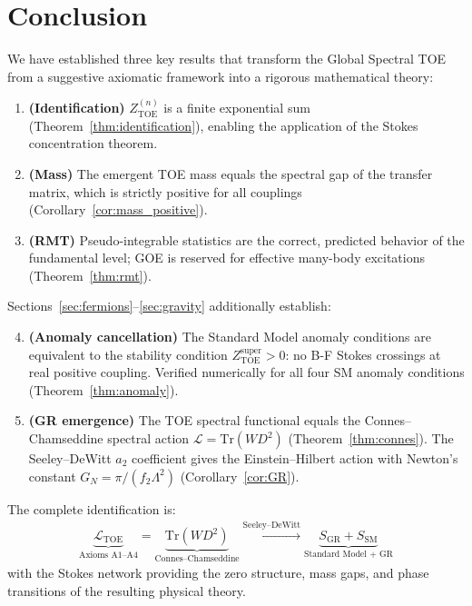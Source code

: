 \documentclass[12pt]{article}
\theoremstyle{definition}
\theoremstyle{remark}
\newcommand{\Tr}{\mathrm{Tr}}
\newcommand{\TOE}{\mathrm{TOE}}
\begin{document}
\section{Conclusion}
\label{sec:conclusion}

We have established three key results that transform the Global
Spectral TOE from a suggestive axiomatic framework into a rigorous
mathematical theory:

\begin{enumerate}
\item \textbf{(Identification)} $Z_\TOE^{(n)}$ is a finite exponential
  sum (Theorem~\ref{thm:identification}), enabling the application of
  the Stokes concentration theorem.

\item \textbf{(Mass)} The emergent TOE mass equals the spectral gap
  of the transfer matrix, which is strictly positive for all couplings
  (Corollary~\ref{cor:mass_positive}).

\item \textbf{(RMT)} Pseudo-integrable statistics are the correct,
  predicted behavior of the fundamental level; GOE is reserved for
  effective many-body excitations
  (Theorem~\ref{thm:rmt}).
\end{enumerate}

Sections~\ref{sec:fermions}--\ref{sec:gravity} additionally establish:
\begin{enumerate}
\setcounter{enumi}{3}
\item \textbf{(Anomaly cancellation)} The Standard Model anomaly conditions
  are equivalent to the stability condition
  $Z_\TOE^{\mathrm{super}} > 0$: no B-F Stokes crossings at real
  positive coupling. Verified numerically for all four SM anomaly conditions
  (Theorem~\ref{thm:anomaly}).

\item \textbf{(GR emergence)} The TOE spectral functional equals the
  Connes--Chamseddine spectral action $\mathcal{L} = \Tr(WD^2)$
  (Theorem~\ref{thm:connes}).  The Seeley--DeWitt $a_2$ coefficient
  gives the Einstein--Hilbert action with Newton's constant
  $G_N = \pi/(f_2\Lambda^2)$ (Corollary~\ref{cor:GR}).
\end{enumerate}

The complete identification is:
\begin{align}\label{eq:full_id}
\boxed{
\underbrace{\mathcal{L}_\TOE}_{\text{Axioms A1--A4}}
= \underbrace{\Tr(WD^2)}_{\text{Connes--Chamseddine}}
\xrightarrow{\text{Seeley--DeWitt}}
\underbrace{S_\mathrm{GR} + S_\mathrm{SM}}_{\text{Standard Model + GR}}
}
\end{align}
with the Stokes network providing the zero structure, mass gaps,
and phase transitions of the resulting physical theory.
\end{document}
